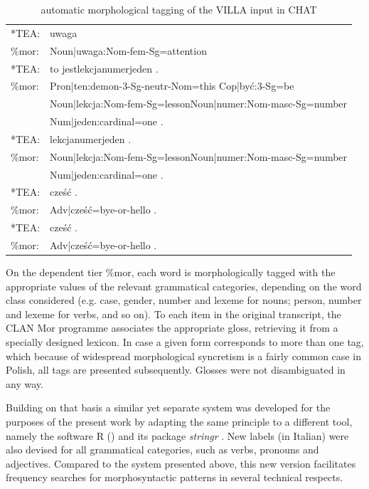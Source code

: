 \begin{table}
\ttfamily
    \begin{tabular}{ll}
        *TEA:   & uwaga\\
        \%mor:  & Noun|uwaga:Nom-fem-Sg=attention\\
        *TEA:   & to jestlekcjanumerjeden . \\
        \%mor:  & Pron|ten:demon-3-Sg-neutr-Nom=this Cop|być:3-Sg=be \\
        ~       & Noun|lekcja:Nom-fem-Sg=lessonNoun|numer:Nom-masc-Sg=number\\
        ~       & Num|jeden:cardinal=one . \\
        *TEA:   & lekcjanumerjeden .  \\
        \%mor:  & Noun|lekcja:Nom-fem-Sg=lessonNoun|numer:Nom-masc-Sg=number\\
        ~       & Num|jeden:cardinal=one . \\
        *TEA:   & cześć .  \\
        \%mor:  & Adv|cześć=bye-or-hello . \\
        *TEA:   & cześć .  \\
        \%mor:  & Adv|cześć=bye-or-hello . \\
    \end{tabular}
    \caption{automatic morphological tagging of the VILLA input in CHAT}
    \label{fig:02:5}
\end{table}

On the dependent tier \%mor, each word is morphologically tagged with the appropriate values of the relevant grammatical categories, depending on the word class considered (e.g. case, gender, number and lexeme for nouns; person, number and lexeme for verbs, and so on). To each item in the original transcript, the CLAN Mor programme associates the appropriate gloss, retrieving it from a specially designed lexicon. In case a given form corresponds to more than one tag, which because of widespread morphological syncretism is a fairly common case in Polish, all tags are presented subsequently. Glosses were not disambiguated in any way.

Building on that basis  a similar yet separate system was developed for the purposes of the present work by adapting the same principle to a different tool, namely the software R (\citealt{RCoreTeam2017}) and its package \textit{stringr} \citep{Wickham2017}. New labels (in Italian) were also devised for all grammatical categories, such as verbs, pronouns and adjectives. Compared to the system presented above, this new version facilitates frequency searches for morphosyntactic patterns in several technical respects.

